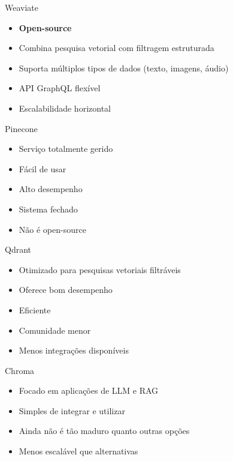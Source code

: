 \documentclass{beamer}
\begin{document}
\begin{frame}{Weaviate}
    \begin{itemize}
        \item \textbf{Open-source}
        \item Combina pesquisa vetorial com filtragem estruturada
        \item Suporta múltiplos tipos de dados (texto, imagens, áudio)
        \item API GraphQL flexível
        \item Escalabilidade horizontal
    \end{itemize}
\end{frame}

\begin{frame}{Pinecone}
    \begin{itemize}
        \item Serviço totalmente gerido
        \item Fácil de usar
        \item Alto desempenho
        \item Sistema fechado
        \item Não é open-source
    \end{itemize}
\end{frame}

\begin{frame}{Qdrant}
    \begin{itemize}
        \item Otimizado para pesquisas vetoriais filtráveis
        \item Oferece bom desempenho
        \item Eficiente
        \item Comunidade menor
        \item Menos integrações disponíveis
    \end{itemize}
\end{frame}

\begin{frame}{Chroma}
    \begin{itemize}
        \item Focado em aplicações de LLM e RAG
        \item Simples de integrar e utilizar
        \item Ainda não é tão maduro quanto outras opções
        \item Menos escalável que alternativas
    \end{itemize}
\end{frame}
\end{document}
